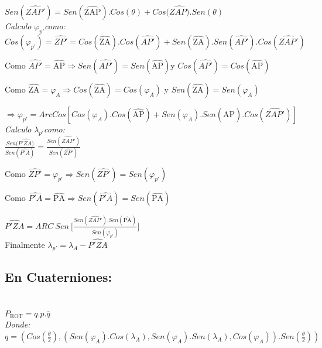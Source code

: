\documentclass[spanish]{article}
\begin{document}
\(Sen(\widehat{ZAP'}) = Sen(\widehat{\text{ZAP}}).Cos(\theta) + Cos(\widehat{ZAP)}.Sen(\theta)\)\\

\emph{Calculo} \(\varphi_{p'}\)\emph{como:}\\

\(Cos(\varphi_{p'}) = \widehat{ZP'} = Cos(\widehat{\text{ZA}}).Cos(\widehat{AP'}) + Sen(\widehat{\text{ZA}}).Sen(\widehat{AP'}).Cos(\widehat{ZAP'})\)

Como
\(\widehat{AP'} = \widehat{\text{AP}} \Rightarrow Sen(\widehat{AP'}) = Sen(\widehat{\text{AP}})\)y
\(Cos(\widehat{AP'}) = Cos(\widehat{\text{AP}})\)

Como
\(\widehat{\text{ZA}} = \varphi_{A} \Rightarrow Cos(\widehat{\text{ZA}}) = Cos(\varphi_{A})\)
y \(Sen(\widehat{\text{ZA}}) = Sen(\varphi_{A})\)

\(\Rightarrow \varphi_{p'} = ArcCos[ Cos(\varphi_{A}).Cos(\widehat{\text{AP}}) + Sen(\varphi_{A}).Sen(\widehat{\text{AP}}).Cos(\widehat{ZAP'}) ]\)\\

\emph{Calculo} \(\lambda_{p'}\)\emph{como:}\\

\(\frac{Sen(\widehat{P'ZA)}}{Sen(\widehat{P'A})} = \frac{Sen(\widehat{ZAP'})}{Sen(\widehat{ZP'})}\)

Como
\(\widehat{ZP'} = \varphi_{p'} \Rightarrow Sen(\widehat{ZP'}) = Sen(\varphi_{p'})\)

Como
\(\widehat{P'A} = \widehat{\text{PA}} \Rightarrow Sen(\widehat{P'A}) = Sen(\widehat{\text{PA}})\)

\(\widehat{P'ZA} = ARC\ Sen\ \lbrack\frac{Sen(\widehat{ZAP'}).Sen(\widehat{\text{PA}})}{Sen(\varphi_{p'})}\rbrack\)\\

Finalmente \(\lambda_{p'} = \lambda_{A} - \widehat{P'ZA}\)\\

\subsection{En Cuaterniones:}\\

\(P_{\text{ROT}} = q.p.\overline{q}\)\\

\emph{Donde:}\\

\(q = (Cos(\frac{\theta}{2}),(Sen(\varphi_{A}).Cos(\lambda_{A}),Sen(\varphi_{A}).Sen(\lambda_{A}),Cos(\varphi_{A})).Sen(\frac{\theta}{2}))\)
\end{document}
